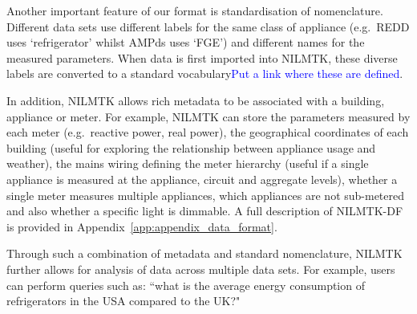 \documentclass{sig-alternate}
\newcommand{\bluecolor}[1]{\textcolor{blue}{#1}}
\newcommand{\appref}[1]{Appendix~\ref{#1}}
\begin{document}
Another important feature of our format is standardisation of nomenclature.  Different data sets use different labels for the same class of appliance (e.g.\ REDD uses `refrigerator' whilst AMPds uses `FGE') and different names for the measured parameters.  When data is first imported into NILMTK, these diverse labels are converted to a standard vocabulary\bluecolor{Put a link where these are defined}.

In addition, NILMTK allows rich metadata to be associated with a building, appliance or meter.  For example, NILMTK can store the parameters measured by each meter (e.g.\ reactive power, real power), the geographical coordinates of each building (useful for exploring the relationship between appliance usage and weather), the mains wiring defining the meter hierarchy (useful if a single appliance is measured at the appliance, circuit and aggregate levels), whether a single meter measures multiple appliances, which appliances are not sub-metered and also whether a specific light is dimmable. A full description of NILMTK-DF is provided in \appref{app:appendix_data_format}.


Through such a combination of metadata and standard nomenclature, NILMTK further allows for analysis of data across multiple  data sets. For example, users can perform queries such as:
``what is the average energy consumption of refrigerators in the USA compared to the UK?"
\end{document}
